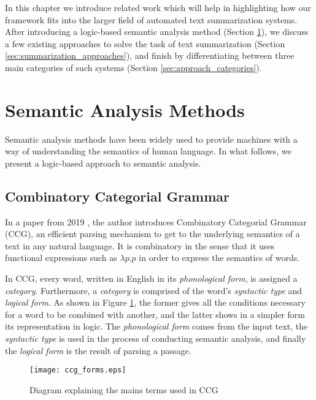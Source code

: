 \label{chapter:related_work}

In this chapter we introduce related work which will help in highlighting how our framework fits into the larger field of automated text summarization systems. After introducing a logic-based semantic analysis method (Section \ref{sec:semantic_analysis_methods}), we discuss a few existing approaches to solve the task of text summarization (Section \ref{sec:summarization_approaches}), and finish by differentiating between three main categories of such systems (Section \ref{sec:approach_categories}).

\section{Semantic Analysis Methods}
\label{sec:semantic_analysis_methods}

Semantic analysis methods have been widely used to provide machines with a way of understanding the semantics of human language. In what follows, we present a logic-based approach to semantic analysis.

\subsection{Combinatory Categorial Grammar}
\label{ssec:ccg}

In a paper from 2019 \cite{steedman_combinatory_nodate}, the author introduces Combinatory Categorial Grammar (CCG), an efficient parsing mechanism to get to the underlying semantics of a text in any natural language. It is combinatory in the sense that it uses functional expressions such as $\lambda p.p$ in order to express the semantics of words.

In CCG, every word, written in English in its \textit{phonological form}, is assigned a \textit{category}. Furthermore, a \textit{category} is comprised of the word's \textit{syntactic type} and \textit{logical form}. As shown in Figure \ref{fig:ccg_forms}, the former gives all the conditions necessary for a word to be combined with another, and the latter shows in a simpler form its representation in logic. The \textit{phonological form} comes from the input text, the \textit{syntactic type} is used in the process of conducting semantic analysis, and finally the \textit{logical form} is the result of parsing a passage.

\begin{figure}[H]
\centering
\texttt{[image: ccg\_forms.eps]}
\caption{\cite{steedman_combinatory_nodate} Diagram explaining the mains terms used in CCG}
\label{fig:ccg_forms}
\end{figure}

